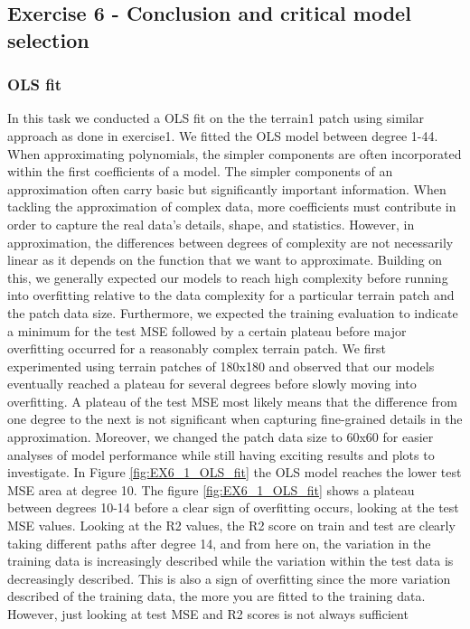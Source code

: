 \documentclass[11pt, a4paper]{article}
\begin{document}
\newpage
\subsection*{Exercise 6 - Conclusion and critical model selection}
\subsubsection*{OLS fit}
In this task we conducted a OLS fit on the the terrain1 patch using similar approach as done in exercise1. We fitted the OLS model between degree 1-44.
When approximating polynomials, the simpler components are often incorporated within the first coefficients of a model. The simpler components of an approximation
often carry basic but significantly important information. When tackling the approximation of complex data, more coefficients must contribute in order to capture the
real data's details, shape, and statistics. However, in approximation, the differences between degrees of complexity are not necessarily linear as it depends on the
function that we want to approximate. Building on this, we generally expected our models to reach high complexity before running into overfitting relative to the data
complexity for a particular terrain patch and the patch data size. Furthermore, we expected the training evaluation to indicate a minimum for the test MSE followed by a
certain plateau before major overfitting occurred for a reasonably complex terrain patch.
We first experimented using terrain patches of 180x180 and observed that our models eventually reached a plateau for several degrees before slowly moving into overfitting.
A plateau of the test MSE most likely means that the difference from one degree to the next is not significant when capturing fine-grained details in the approximation.
Moreover, we changed the patch data size to 60x60 for easier analyses of model performance while still having exciting results and plots to investigate.
In Figure \ref{fig:EX6_1_OLS_fit} the OLS model reaches the lower test MSE area at degree 10. The figure \ref{fig:EX6_1_OLS_fit} shows a plateau between degrees 10-14 before a clear sign of overfitting occurs,
looking at the test MSE values. Looking at the R2 values, the R2 score on train and test are clearly taking different paths after degree 14, and from here on,
the variation in the training data is increasingly described while the variation within the test data is decreasingly described. This is also a sign of overfitting since
the more variation described of the training data, the more you are fitted to the training data. However, just looking at test MSE and R2 scores is not always sufficient
\end{document}
